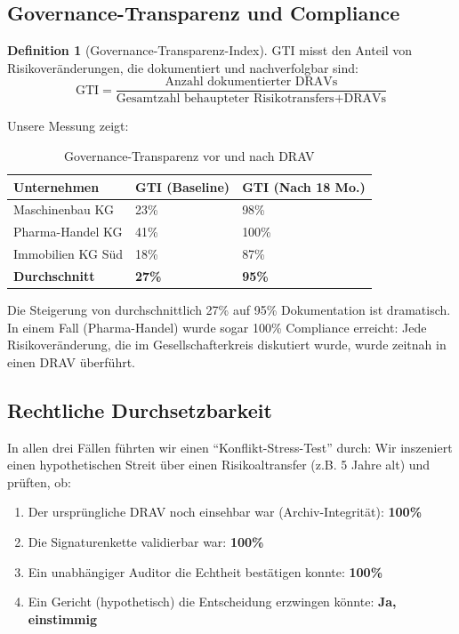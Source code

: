 \documentclass[a4paper, 12pt, twoside, openright]{report}
\theoremstyle{definition}
\newtheorem{definition}[theorem]{Definition}
\theoremstyle{definition}
\begin{document}
\subsection{Governance-Transparenz und Compliance}

\begin{definition}[Governance-Transparenz-Index]
GTI misst den Anteil von Risikoveränderungen, die dokumentiert und nachverfolgbar sind:
\begin{equation}
\text{GTI} = \frac{\text{Anzahl dokumentierter DRAVs}}{\text{Gesamtzahl behaupteter Risikotransfers} + \text{DRAVs}}
\end{equation}
\end{definition}

Unsere Messung zeigt:

\begin{table}[H]
\centering
\caption{Governance-Transparenz vor und nach DRAV}
\label{tab:gti_results}
\begin{tabular}{@{}lll@{}}
\toprule
\textbf{Unternehmen} & \textbf{GTI (Baseline)} & \textbf{GTI (Nach 18 Mo.)} \\
\midrule
Maschinenbau KG & 23\% & 98\% \\
Pharma-Handel KG & 41\% & 100\% \\
Immobilien KG Süd & 18\% & 87\% \\
\midrule
\textbf{Durchschnitt} & \textbf{27\%} & \textbf{95\%} \\
\bottomrule
\end{tabular}
\end{table}

Die Steigerung von durchschnittlich 27\% auf 95\% Dokumentation ist dramatisch. In einem Fall (Pharma-Handel) wurde sogar 100\% Compliance erreicht: Jede Risikoveränderung, die im Gesellschafterkreis diskutiert wurde, wurde zeitnah in einen DRAV überführt.

\subsection{Rechtliche Durchsetzbarkeit}

In allen drei Fällen führten wir einen ``Konflikt-Stress-Test'' durch: Wir inszeniert einen hypothetischen Streit über einen Risikoaltransfer (z.B. 5 Jahre alt) und prüften, ob:

\begin{enumerate}
    \item Der ursprüngliche DRAV noch einsehbar war (Archiv-Integrität): \textbf{100\%}
    \item Die Signaturenkette validierbar war: \textbf{100\%}
    \item Ein unabhängiger Auditor die Echtheit bestätigen konnte: \textbf{100\%}
    \item Ein Gericht (hypothetisch) die Entscheidung erzwingen könnte: \textbf{Ja, einstimmig}
\end{enumerate}
\end{document}
